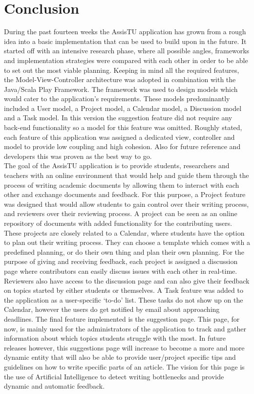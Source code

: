 \chapter{Conclusion}

During the past fourteen weeks the AssisTU application has grown from a rough idea into a basic implementation that can be used to build upon in the future. It started off with an intensive research phase, where all possible angles, frameworks and implementation strategies were compared with each other in order to be able to set out the most viable planning. Keeping in mind all the required features, the Model-View-Controller architecture was adopted in combination with the Java/Scala Play Framework. The framework was used to design models which would cater to the application's requirements. These models predominantly included a User model, a Project model, a Calendar model, a Discussion model and a Task model. In this version the suggestion feature did not require any back-end functionality so a model for this feature was omitted. Roughly stated, each feature of this application was assigned a dedicated view, controller and model to provide low coupling and high cohesion. Also for future reference and developers this was proven as the best way to go. \\

The goal of the AssisTU application is to provide students, researchers and teachers with an online environment that would help and guide them through the process of writing academic documents by allowing them to interact with each other and exchange documents and feedback. For this purpose, a Project feature was designed that would allow students to gain control over their writing process, and reviewers over their reviewing process. A project can be seen as an online repository of documents with added functionality for the contributing users. These projects are closely related to a Calendar, where students have the option to plan out their writing process. They can choose a template which comes with a predefined planning, or do their own thing and plan their own planning. For the purpose of giving and receiving feedback, each project is assigned a discussion page where contributors can easily discuss issues with each other in real-time. Reviewers also have access to the discussion page and can also give their feedback on topics started by either students or themselves. A Task feature was added to the application as a user-specific `to-do' list. These tasks do not show up on the Calendar, however the users do get notified by email about approaching deadlines. The final feature implemented is the suggestion page. This page, for now, is mainly used for the administrators of the application to track and gather information about which topics students struggle with the most. In future releases however, this suggestions page will increase to become a more and more dynamic entity that will also be able to provide user/project specific tips and guidelines on how to write specific parts of an article. The vision for this page is the use of Artificial Intelligence to detect writing bottlenecks and provide dynamic and automatic feedback. \\ 

